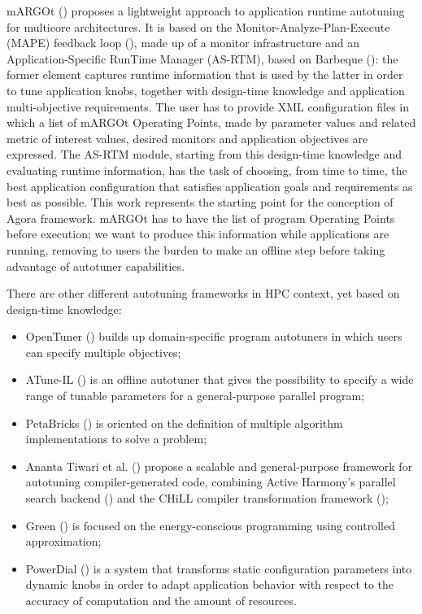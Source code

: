 mARGOt (\cite{gadioli2015application}) proposes a lightweight approach to application runtime autotuning for multicore architectures. It is based on the Monitor-Analyze-Plan-Execute (MAPE) feedback loop (\cite{kephart2003vision}), made up of a monitor infrastructure and an Application-Specific RunTime Manager (AS-RTM), based on Barbeque \hbox{(\cite{bellasi2012rtrm})}: the former element captures runtime information that is used by the latter in order to tune application knobs, together with design-time knowledge and application multi-objective requirements. The user has to provide XML configuration files in which a list of mARGOt Operating Points, made by parameter values and related metric of interest values, desired monitors and application objectives are expressed. The AS-RTM module, starting from this design-time knowledge and evaluating runtime information, has the task of choosing, from time to time, the best application configuration that satisfies application goals and requirements as best as possible. This work represents the starting point for the conception of Agora framework. mARGOt has to have the list of program Operating Points before execution; we want to produce this information while applications are running, removing to users the burden to make an offline step before taking advantage of autotuner capabilities.

There are other different autotuning frameworks in HPC context, yet based on design-time knowledge: 

\begin{itemize}

	\item OpenTuner (\cite{ansel2014opentuner}) builds up domain-specific program autotuners in which users can specify multiple objectives;
	
	\item ATune-IL (\cite{schaefer2009atune}) is an offline autotuner that gives the possibility to specify a wide range of tunable parameters for a general-purpose parallel program;

	\item PetaBricks (\cite{ansel2009petabricks}) is oriented on the definition of multiple algorithm implementations to solve a problem;

	\item Ananta Tiwari et al. (\cite{tiwari2009scalable}) propose a scalable and general-purpose framework for autotuning compiler-generated code, combining Active Harmony's parallel search backend (\cite{chung2004using}) and the CHiLL compiler transformation framework (\cite{chen2008chill});

	\item Green (\cite{baek2010green}) is focused on the energy-conscious programming using controlled approximation;

	\item PowerDial (\cite{hoffmann2011dynamic}) is a system that transforms static configuration parameters into dynamic knobs in order to adapt application behavior with respect to the accuracy of computation and the amount of resources.

\end{itemize}

